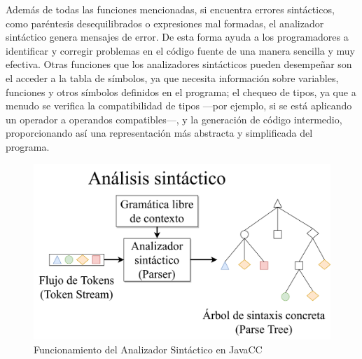 Además de todas las funciones mencionadas, si encuentra errores sintácticos, como paréntesis desequilibrados o expresiones mal formadas, el analizador sintáctico genera mensajes de error\cite{traductorescompiladoreseinterpretes}. De esta forma ayuda a los programadores a identificar y corregir problemas en el código fuente de una manera sencilla y muy efectiva. Otras funciones que los analizadores sintácticos pueden desempeñar son el acceder a la tabla de símbolos, ya que necesita información sobre variables, funciones y otros símbolos definidos en el programa; el chequeo de tipos, ya que a menudo se verifica la compatibilidad de tipos ---por ejemplo, si se está aplicando un operador a operandos compatibles---, y la generación de código intermedio, proporcionando así una representación más abstracta y simplificada del programa.

\begin{figure}[H]
	\centering
	\includegraphics[width=\textwidth]{imagenes/analizadorsintactico.png}
	\caption{\label{fig:analizadorsintactico}Funcionamiento del Analizador Sintáctico en JavaCC\cite{ytanalizadorsintactico}}
\end{figure}




